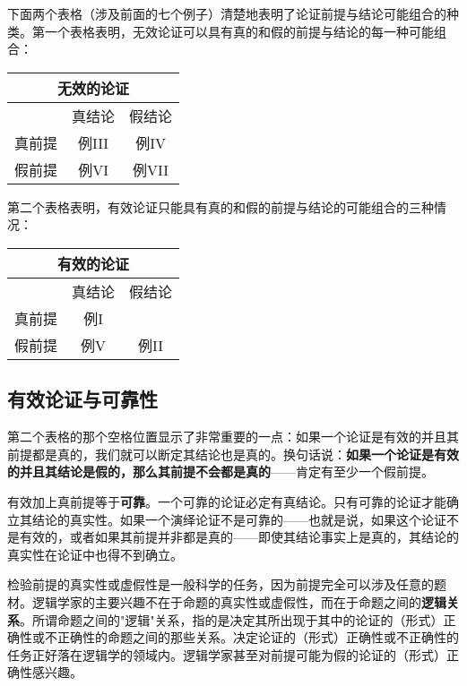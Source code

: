 下面两个表格（涉及前面的七个例子）清楚地表明了论证前提与结论可能组合的种类。第一个表格表明，无效论证可以具有真的和假的前提与结论的每一种可能组合：

\begin{center}
\begin{tabular}{|c|c|c|}
\hline
\multicolumn{3}{|c|}{无效的论证} \\
\hline
 & 真结论 & 假结论 \\
\hline
真前提 & 例III & 例IV \\
\hline
假前提 & 例VI & 例VII \\
\hline
\end{tabular}
\end{center}

第二个表格表明，有效论证只能具有真的和假的前提与结论的可能组合的三种情况：

\begin{center}
\begin{tabular}{|c|c|c|}
\hline
\multicolumn{3}{|c|}{有效的论证} \\
\hline
 & 真结论 & 假结论 \\
\hline
真前提 & 例I & \multicolumn{1}{|c|}{} \\
\hline
假前提 & 例V & 例II \\
\hline
\end{tabular}
\end{center}

\subsection{有效论证与可靠性}

第二个表格的那个空格位置显示了非常重要的一点：如果一个论证是有效的并且其前提都是真的，我们就可以断定其结论也是真的。换句话说：\textbf{如果一个论证是有效的并且其结论是假的，那么其前提不会都是真的}——肯定有至少一个假前提。

有效加上真前提等于\textbf{可靠}。一个可靠的论证必定有真结论。只有可靠的论证才能确立其结论的真实性。如果一个演绎论证不是可靠的——也就是说，如果这个论证不是有效的，或者如果其前提并非都是真的——即使其结论事实上是真的，其结论的真实性在论证中也得不到确立。

检验前提的真实性或虚假性是一般科学的任务，因为前提完全可以涉及任意的题材。逻辑学家的主要兴趣不在于命题的真实性或虚假性，而在于命题之间的\textbf{逻辑关系}。所谓命题之间的"逻辑"关系，指的是决定其所出现于其中的论证的（形式）正确性或不正确性的命题之间的那些关系。决定论证的（形式）正确性或不正确性的任务正好落在逻辑学的领域内。逻辑学家甚至对前提可能为假的论证的（形式）正确性感兴趣。

